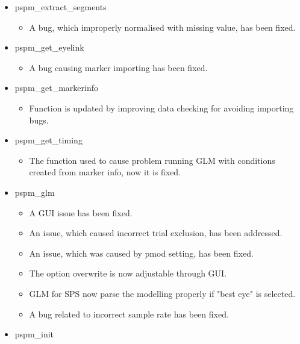 \documentclass[english]{article}
\numberwithin{equation}{section}
\numberwithin{figure}{section}
\begin{document}
\begin{itemize}
\item pspm\_extract\_segments

\begin{itemize}
\item A bug, which improperly normalised with missing value, has been fixed.
\end{itemize}

\item pspm\_get\_eyelink

\begin{itemize}
\item A bug causing marker importing has been fixed.
\end{itemize}

\item pspm\_get\_markerinfo

\begin{itemize}
\item Function is updated by improving data checking for avoiding importing bugs.
\end{itemize}

\item pspm\_get\_timing

\begin{itemize}
\item The function used to cause problem running GLM with conditions created from marker info, now it is fixed.
\end{itemize}

\item pspm\_glm

\begin{itemize}
\item A GUI issue has been fixed.

\item An issue, which caused incorrect trial exclusion, has been addressed.

\item An issue, which was caused by pmod setting, has been fixed.

\item The option overwrite is now adjustable through GUI.

\item GLM for SPS now parse the modelling properly if "best eye" is selected.

\item A bug related to incorrect sample rate has been fixed.
\end{itemize}

\item pspm\_init


\end{itemize}
\end{document}
